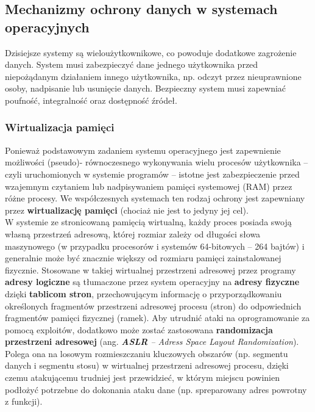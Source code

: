 \subsection{Mechanizmy ochrony danych w systemach operacyjnych}

Dzisiejsze systemy są wieloużytkownikowe, co powoduje dodatkowe zagrożenie danych. System musi zabezpieczyć dane jednego użytkownika przed niepożądanym działaniem innego użytkownika, np. odczyt przez nieuprawnione osoby, nadpisanie lub usunięcie danych. Bezpieczny system musi zapewniać poufność, integralność oraz dostępność źródeł.

\subsubsection{Wirtualizacja pamięci}

Ponieważ podstawowym zadaniem systemu operacyjnego jest zapewnienie możliwości (pseudo)- równoczesnego wykonywania wielu procesów użytkownika – czyli uruchomionych w systemie programów – istotne jest zabezpieczenie przed wzajemnym czytaniem lub nadpisywaniem pamięci systemowej (RAM) przez różne procesy. We współczesnych systemach ten rodzaj ochrony jest zapewniany przez \textbf{wirtualizację pamięci} (chociaż nie jest to jedyny jej cel).\\

W systemie ze stronicowaną pamięcią wirtualną, każdy proces posiada swoją własną przestrzeń adresową, której rozmiar zależy od długości słowa maszynowego (w przypadku procesorów i systemów 64-bitowych – 264 bajtów) i generalnie może być znacznie większy od rozmiaru pamięci zainstalowanej fizycznie. Stosowane w takiej wirtualnej przestrzeni adresowej przez programy \textbf{adresy logiczne} są tłumaczone przez system operacyjny na \textbf{adresy fizyczne} dzięki \textbf{tablicom stron}, przechowującym informację o przyporządkowaniu określonych fragmentów przestrzeni adresowej procesu (stron) do odpowiednich fragmentów pamięci fizycznej (ramek). Aby utrudnić ataki na oprogramowanie za pomocą exploitów, dodatkowo może zostać zastosowana \textbf{randomizacja przestrzeni adresowej} (ang. \textit{\textbf{ASLR} – Adress Space Layout Randomization}). Polega ona na losowym rozmieszczaniu kluczowych obszarów (np. segmentu danych i segmentu stosu) w wirtualnej przestrzeni adresowej procesu, dzięki czemu atakującemu trudniej jest przewidzieć, w którym miejscu powinien podłożyć potrzebne do dokonania ataku dane (np. spreparowany adres powrotny z funkcji). \\

